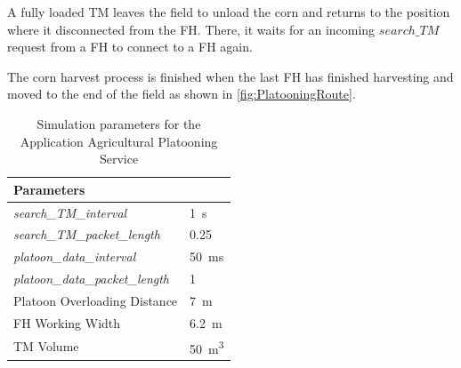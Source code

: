 A fully loaded \ac{TM} leaves the field to unload the corn and returns to the position where it disconnected from the \ac{FH}.
There, it waits for an incoming $search\_TM$ request from a \ac{FH} to connect to a \ac{FH} again.

The corn harvest process is finished when the last \ac{FH} has finished harvesting and moved to the end of the field as
shown in \autoref{fig:PlatooningRoute}.

\begin{table}[H]
	\centering
	\begin{tabular}{p{5cm}p{4cm}}
		\toprule
		Parameters & \\
		\midrule
		\textit{search\_TM\_interval} & \SI{1}{\second}\\
		\textit{search\_TM\_packet\_length} & \SI{0.25}{\kilo\byte}\\
		\textit{platoon\_data\_interval} & \SI{50}{\milli\second}\\
		\textit{platoon\_data\_packet\_length} & \SI{1}{\kilo\byte}\\
		Platoon Overloading Distance & \SI{7}{\meter}\\
		\ac{FH} Working Width & \SI{6.2}{\meter}\\
		\ac{TM} Volume & \SI{50}{\cubic\meter}\\
		\bottomrule
	\end{tabular}
	\caption{Simulation parameters for the Application Agricultural Platooning Service}
	\label{tab:SimulationParameters}
\end{table}

